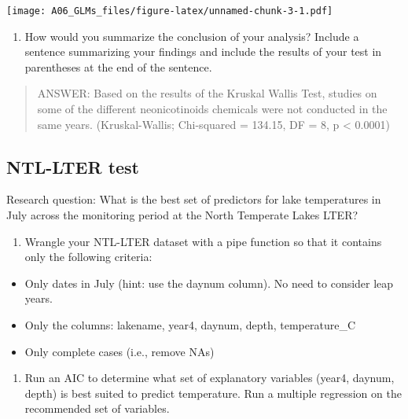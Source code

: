 \documentclass[]{article}
\providecommand{\tightlist}{%
  \setlength{\itemsep}{0pt}\setlength{\parskip}{0pt}}
\begin{document}
\texttt{[image: A06\_GLMs\_files/figure-latex/unnamed-chunk-3-1.pdf]}

\begin{enumerate}
\def\labelenumi{\arabic{enumi}.}
\setcounter{enumi}{8}
\tightlist
\item
  How would you summarize the conclusion of your analysis? Include a
  sentence summarizing your findings and include the results of your
  test in parentheses at the end of the sentence.
\end{enumerate}

\begin{quote}
ANSWER: Based on the results of the Kruskal Wallis Test, studies on some
of the different neonicotinoids chemicals were not conducted in the same
years. (Kruskal-Wallis; Chi-squared = 134.15, DF = 8, p \textless{}
0.0001)
\end{quote}

\subsection{NTL-LTER test}\label{ntl-lter-test}

Research question: What is the best set of predictors for lake
temperatures in July across the monitoring period at the North Temperate
Lakes LTER?

\begin{enumerate}
\def\labelenumi{\arabic{enumi}.}
\setcounter{enumi}{10}
\tightlist
\item
  Wrangle your NTL-LTER dataset with a pipe function so that it contains
  only the following criteria:
\end{enumerate}

\begin{itemize}
\tightlist
\item
  Only dates in July (hint: use the daynum column). No need to consider
  leap years.
\item
  Only the columns: lakename, year4, daynum, depth, temperature\_C
\item
  Only complete cases (i.e., remove NAs)
\end{itemize}

\begin{enumerate}
\def\labelenumi{\arabic{enumi}.}
\setcounter{enumi}{11}
\tightlist
\item
  Run an AIC to determine what set of explanatory variables (year4,
  daynum, depth) is best suited to predict temperature. Run a multiple
  regression on the recommended set of variables.
\end{enumerate}
\end{document}
